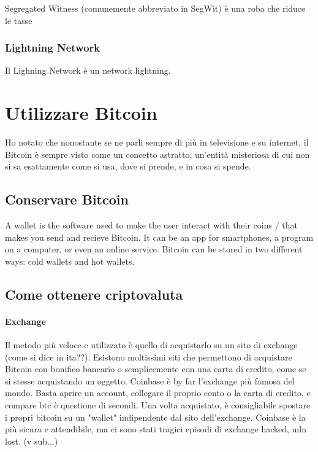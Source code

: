 \documentclass {article}
\begin{document}
Segregated Witness (comunemente abbreviato in SegWit) è una roba che riduce le tasse


\subsubsection {Lightning Network}


Il Lighning Network è un network lightning.


\section {Utilizzare Bitcoin}


Ho notato che nonostante se ne parli sempre di più in televisione e su internet, il Bitcoin è sempre visto come un concetto astratto, un'entità misteriosa di cui non si sa esattamente come si usa, dove si prende, e in cosa si spende.


\subsection {Conservare Bitcoin}


A wallet is the software used to make the user interact with their coins / that makes you send and recieve Bitcoin.
It can be an app for smartphones, a program on a computer, or even an online service.
Bitcoin can be stored in two different ways: cold wallets and hot wallets.


\subsection {Come ottenere criptovaluta}


\paragraph {Exchange}


Il metodo più veloce e utilizzato è quello di acquistarlo su un sito di exchange (come si dice in ita??). Esistono moltissimi siti che permettono di acquistare Bitcoin con bonifico bancario o semplicemente con una carta di credito, come se si stesse acquistando un oggetto.
Coinbase è by far l'exchange più famosa del mondo. Basta aprire un account, collegare il proprio conto o la carta di credito, e compare btc è questione di secondi.
Una volta acquistato, è consigliabile spostare i propri bitcoin su un "wallet" indipendente dal sito dell'exchange. Coinbase è la più sicura e attendibile, ma ci sono stati tragici episodi di exchange hacked, mln lost. (v sub...)
\end{document}
